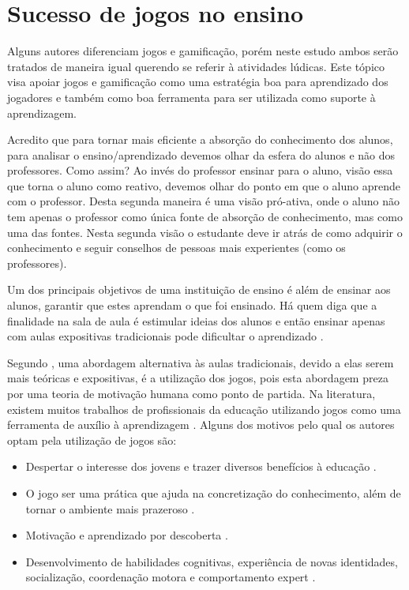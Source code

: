 
\section[Sucesso de jogos no ensino]{Sucesso de jogos no ensino}

Alguns autores diferenciam jogos e gamificação, porém neste estudo ambos serão tratados de maneira igual querendo se referir à atividades lúdicas. Este tópico visa apoiar jogos e gamificação como uma estratégia boa para aprendizado dos jogadores e também como boa ferramenta para ser utilizada como suporte à aprendizagem.  

Acredito que para tornar mais eficiente a absorção do conhecimento dos alunos, para analisar o ensino/aprendizado devemos olhar da esfera do alunos e não dos professores. Como assim? Ao invés do professor ensinar para o aluno, visão essa que torna o aluno como reativo, devemos olhar do ponto em que o aluno aprende com o professor. Desta segunda maneira é uma visão pró-ativa, onde o aluno não tem apenas o professor como única fonte de absorção de conhecimento, mas como uma das fontes. Nesta segunda visão o estudante deve ir atrás de como adquirir o conhecimento e seguir conselhos de pessoas mais experientes (como os professores). 

Um dos principais objetivos de uma instituição de ensino é além de ensinar aos alunos, garantir que estes aprendam o que foi ensinado. Há quem diga que a finalidade na sala de aula é estimular ideias dos alunos e então ensinar apenas com aulas expositivas tradicionais pode dificultar o aprendizado \cite[p. 4]{sucessoJogoEngSoft}.

Segundo , uma abordagem alternativa às aulas tradicionais, devido  a elas serem mais teóricas e expositivas, é a utilização dos jogos, pois esta abordagem preza por uma teoria de motivação humana como ponto de partida. Na literatura, existem muitos trabalhos de profissionais da educação utilizando jogos como uma ferramenta de auxílio à aprendizagem \cite[p. 3]{sucessoJogoEngSoft}. Alguns dos motivos pelo qual os autores optam pela utilização de jogos são:

\begin{itemize}
	\item Despertar o interesse dos jovens e trazer diversos benefícios à educação \cite{appcalculo}.
	\item O jogo ser uma prática que ajuda na concretização do conhecimento, além de tornar o ambiente mais prazeroso \cite{jogoPratPedagoc}. 
	\item Motivação e aprendizado por descoberta .
	\item Desenvolvimento de habilidades cognitivas, experiência de novas identidades, socialização, coordenação motora e comportamento expert \cite[p. 3 e 4]{savi}.
\end{itemize}


